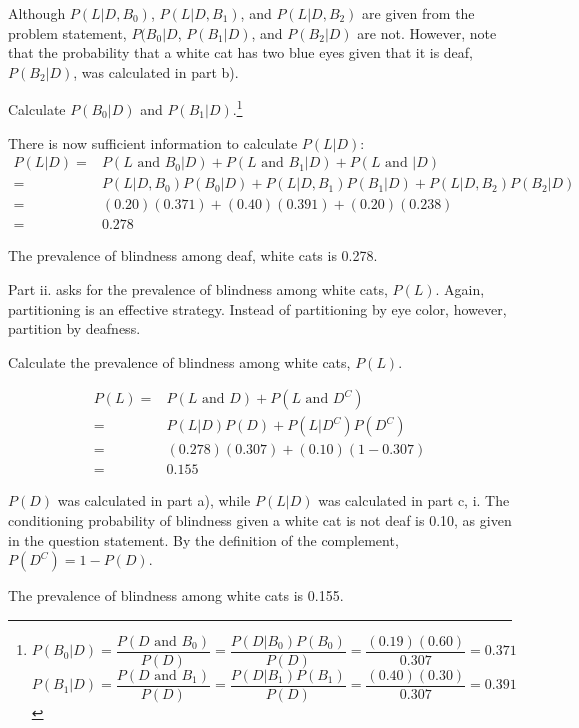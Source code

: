 Although $P(L|D, B_0)$, $P(L|D, B_1)$, and $P(L|D, B_2)$ are given from the problem statement, $P(B_0|D$, $P(B_1|D)$, and $P(B_2|D)$ are not. However, note that the probability that a white cat has two blue eyes given that it is deaf, $P(B_2|D)$, was calculated in part b). 

\begin{exercise}Calculate $P(B_0|D)$ and $P(B_1|D)$.\footnote{\[P(B_0|D) = \dfrac{P(D \textrm{ and } B_0)}{P(D)} = \dfrac{P(D|B_0)P(B_0)}{P(D)} = \dfrac{(0.19)(0.60)}{0.307} = 0.371 \] \[P(B_1|D) = \dfrac{P(D \textrm{ and } B_1)}{P(D)} = \dfrac{P(D|B_1)P(B_1)}{P(D)} = \dfrac{(0.40)(0.30)}{0.307} = 0.391 \]}
\end{exercise}

There is now sufficient information to calculate $P(L|D)$: 
\begin{align*}
P(L|D) =& P(L \textrm{ and } B_0|D) + P(L \textrm{ and } B_1 | D) + P(L \textrm{ and } |D) \\
=& P(L|D, B_0)P(B_0|D) + P(L|D, B_1)P(B_1|D) + P(L|D, B_2)P(B_2|D) \\
=& (0.20)(0.371) + (0.40)(0.391) + (0.20)(0.238) \\
=& 0.278
\end{align*}

The prevalence of blindness among deaf, white cats is 0.278.

Part ii. asks for the prevalence of blindness among white cats, $P(L)$. Again, partitioning is an effective strategy. Instead of partitioning by eye color, however, partition by deafness.

\begin{example}{Calculate the prevalence of blindness among white cats, $P(L)$.}
	
\begin{align*}
P(L) =& P(L \textrm{ and } D) + P(L \textrm{ and } D^C) \\
=& P(L|D)P(D) + P(L|D^C)P(D^C) \\
=& (0.278)(0.307) + (0.10)(1 - 0.307) \\
=& 0.155
\end{align*}	
	
$P(D)$ was calculated in part a), while $P(L|D)$ was calculated in part c, i. The conditioning probability of blindness given a white cat is not deaf is 0.10, as given in the question statement. By the definition of the complement, $P(D^C) = 1 - P(D)$. 

The prevalence of blindness among white cats is 0.155.

\end{example}

